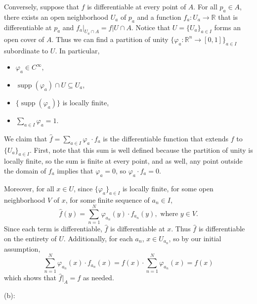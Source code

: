 \documentclass{article}
\theoremstyle{plain} %
\numberwithin{thm}{section} %
\theoremstyle{definition}
\begin{document}
\begin{question}{36}

        Conversely, suppose that \(f\) is differentiable at every point of \(A\). For all \(p_a \in A\), there exists an open neighborhood \(U_a\) of \(p_a\) and a function \(f_a : U_a \to \mathbb{R}\) that is differentiable at \(p_a\) and \(f_a \vert _{U_a \cap A} = f \vert U \cap A\). Notice that \(U = \{U_a\}_{a \in I}\) forms an open cover of \(A\). Thus we can find a partition of unity \(\{ \varphi _a : \mathbb{R}^n \to [0,1]\}_{a\in I}\) subordinate to \(U\). In particular,
        \begin{itemize}
            \item \(\varphi _a \in C^{\infty}\),
            \item \(\mathop{\mathrm{supp}}(\varphi _a)\cap U \subseteq U_a\),
            \item \(\{\mathop{\mathrm{supp}}(\varphi_a)\}\) is locally finite,
            \item \(\sum\limits_{a \in I} \varphi _a = 1\).
        \end{itemize}
        We claim that \(\hat{f} = \sum_{a \in I} \varphi _a \cdot f_a\) is the differentiable function that extends \(f\) to \(\{ U_a \} _{a \in I}\). First, note that this sum is well defined because the partition of unity is locally finite, so the sum is finite at every point, and as well, any point outside the domain of \(f_a\) implies that \(\varphi _a = 0\), so \(\varphi _a \cdot f_a = 0\).

        Moreover, for all \(x \in U\), since \(\{ \varphi _a \}_{a \in I}\) is locally finite, for some open neighborhood \(V\) of \(x\), for some finite sequence of \(a_n \in I\),
        \[
            \hat{f}(y) = \sum_{n=1}^{N} \varphi _{a_n} (y) \cdot f_{a_n}(y), \text{ where } y \in V.
        \]
        Since each term is differentiable, \(\hat{f}\) is differentiable at \(x\). Thus \(\hat{f}\) is differentiable on the entirety of \(U\). Additionally, for each \(a_n\), \(x \in U_{a_n}\), so by our initial assumption,
        \[
            \sum_{n=1}^{N} \varphi _{a_n} (x) \cdot f_{a_n}(x) = f(x) \cdot \sum_{n=1}^{N} \varphi _{a_n} (x) = f(x)
        \]
        which shows that \(\hat{f}\vert _A = f\) as needed.

        \medskip

        (b):
 \end{question}
    \newpage
\end{document}
